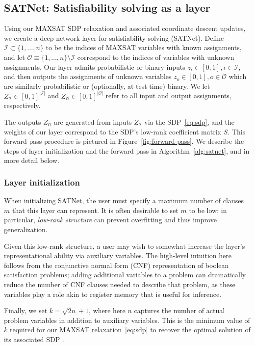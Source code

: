 \documentclass{article}
\newcommand{\inndex}{\iota}
\newcommand{\outdex}{o}
\newcommand{\inset}{\mathcal{I}}
\newcommand{\outset}{\mathcal{O}}
\begin{document}
	\subsection{SATNet: Satisfiability solving as a layer}
	
	Using our MAXSAT SDP relaxation and associated coordinate descent updates, we create a deep network layer for satisfiability solving (SATNet).
	Define $\inset \subset \{1, \ldots, n\}$ to be the indices of MAXSAT variables with known assignments, and let $\outset \equiv \{1, \ldots, n\} \setminus \inset$ correspond to the indices of variables with unknown assignments.
	Our layer admits probabilistic or binary inputs $z_{\inndex} \in [0,1], \inndex \in \inset$, and then outputs the assignments of unknown variables $z_{\outdex} \in [0,1], \outdex \in \outset$ which are similarly probabilistic or (optionally, at test time) binary.
We let $Z_{\inset} \in [0,1]^{|\inset|}$ and $Z_{\outset} \in [0,1]^{|\outset|}$ refer to all input and output assignments, respectively.
	
	The outputs 
	$Z_{\outset}$  are generated from inputs 
	$Z_{\inset}$  via the SDP~\eqref{eq:sdp}, and the weights of our layer correspond to the SDP's low-rank coefficient matrix $S$.
This forward pass procedure is pictured in Figure~\ref{fig:forward-pass}.
	We describe the steps of layer initialization and the forward pass in Algorithm~\ref{alg:satnet}, and in more detail below.
	
	\subsubsection{Layer initialization}
	\label{sec:aux}
	
	When initializing SATNet, the user must specify a maximum number of clauses $m$ that this layer can represent.
	It is often desirable to set $m$ to be low; in particular, \emph{low-rank structure} can prevent overfitting and thus improve generalization. 
	
Given this low-rank structure, a user may wish to somewhat increase the layer's representational ability via auxiliary variables.
The high-level intuition here follows from 
the conjunctive normal form (CNF) representation of boolean satisfaction problems; adding additional variables to a problem can dramatically reduce the number of CNF clauses needed to describe that problem, as these variables play a role akin to register memory that is useful for inference.
	
	Finally, we set $k = \sqrt{2n} + 1$, where here $n$ captures the number of actual problem variables in addition to auxiliary variables. 
	This is the minimum value of $k$ required for our MAXSAT relaxation~\eqref{eq:sdp} to recover the optimal solution of its associated SDP \cite{barvinok1995problems, pataki1998rank}.
	
\end{document}
